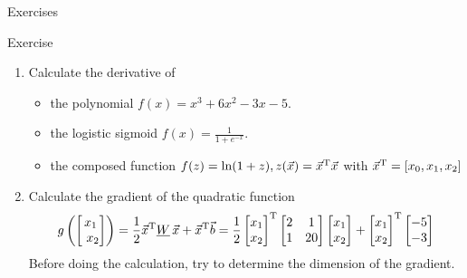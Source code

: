   \begin{frame}{Exercises}
    \begin{exampleblock}{Exercise}
      \begin{enumerate}
        \item Calculate the derivative of
          \begin{itemize}
            \item the polynomial $f(x) = x^3 + 6x^2 - 3x - 5$.
            \item the logistic sigmoid $f(x) = \frac{1}{1+e^{-x}}$.
            \item the composed function
              $f(z) = \ln(1 + z), z(\vec{x}) = \vec{x}^{\text{T}} \vec{x}$
              with $\vec{x}^{\text{T}} = \left[x_0, x_1, x_2\right]$
          \end{itemize}
        \item Calculate the gradient of the quadratic function
          \begin{equation*}
            g\left( \begin{bmatrix}x_1 \\ x_2 \end{bmatrix} \right)
            = \frac{1}{2}
              \vec{x}^\transp \underline{W}\, \vec{x} + \vec{x}^\transp \vec{b}
            = \frac{1}{2}
              \begin{bmatrix} x_1 \\ x_2 \end{bmatrix}^\transp
              \begin{bmatrix} 2 & 1 \\ 1 & 20 \end{bmatrix}
              \begin{bmatrix} x_1 \\ x_2 \end{bmatrix}
              + \begin{bmatrix} x_1 \\ x_2 \end{bmatrix}^\transp
                \begin{bmatrix} -5 \\ -3 \end{bmatrix}
          \end{equation*}
          Before doing the calculation, try to determine the dimension of the gradient.
      \end{enumerate}
    \end{exampleblock}
  \end{frame}

